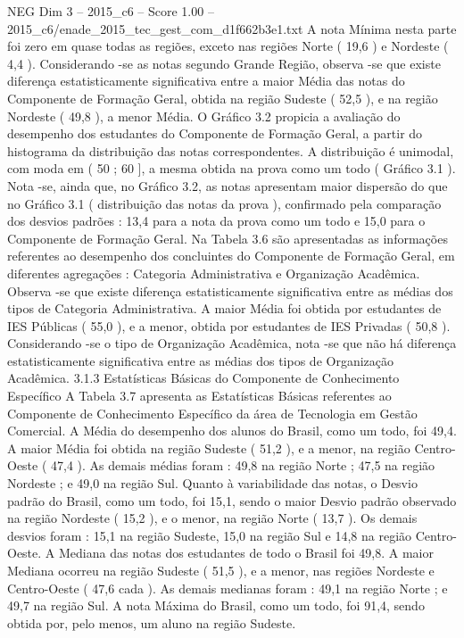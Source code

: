 \begin{textsample}{NEG Dim 3 – 2015\_c6 – Score 1.00 – 2015\_c6/enade\_2015\_tec\_gest\_com\_d1f662b3e1.txt}
A nota Mínima nesta parte foi zero em quase todas as regiões, exceto nas regiões Norte ( 19,6 ) e Nordeste ( 4,4 ).
Considerando -se as notas segundo Grande Região, observa -se que existe diferença estatisticamente significativa entre a maior Média das notas do Componente de Formação Geral, obtida na região Sudeste ( 52,5 ), e na região Nordeste ( 49,8 ), a menor Média.
O Gráfico 3.2 propicia a avaliação do desempenho dos estudantes do Componente de Formação Geral, a partir do histograma da distribuição das notas correspondentes.
A distribuição é unimodal, com moda em ( 50 ; 60 ], a mesma obtida na prova como um todo ( Gráfico 3.1 ).
Nota -se, ainda que, no Gráfico 3.2, as notas apresentam maior dispersão do que no Gráfico 3.1 ( distribuição das notas da prova ), confirmado pela comparação dos desvios padrões : 13,4 para a nota da prova como um todo e 15,0 para o Componente de Formação Geral.
Na Tabela 3.6 são apresentadas as informações referentes ao desempenho dos concluintes do Componente de Formação Geral, em diferentes agregações : Categoria Administrativa e Organização Acadêmica.
Observa -se que existe diferença estatisticamente significativa entre as médias dos tipos de Categoria Administrativa.
A maior Média foi obtida por estudantes de IES Públicas ( 55,0 ), e a menor, obtida por estudantes de IES Privadas ( 50,8 ).
Considerando -se o tipo de Organização Acadêmica, nota -se que não há diferença estatisticamente significativa entre as médias dos tipos de Organização Acadêmica. 3.1.3 Estatísticas Básicas do Componente de Conhecimento Específico A Tabela 3.7 apresenta as Estatísticas Básicas referentes ao Componente de Conhecimento Específico da área de Tecnologia em Gestão Comercial.
A Média do desempenho dos alunos do Brasil, como um todo, foi 49,4.
A maior Média foi obtida na região Sudeste ( 51,2 ), e a menor, na região Centro-Oeste ( 47,4 ).
As demais médias foram : 49,8 na região Norte ; 47,5 na região Nordeste ; e 49,0 na região Sul.
Quanto à variabilidade das notas, o Desvio padrão do Brasil, como um todo, foi 15,1, sendo o maior Desvio padrão observado na região Nordeste ( 15,2 ), e o menor, na região Norte ( 13,7 ).
Os demais desvios foram : 15,1 na região Sudeste, 15,0 na região Sul e 14,8 na região Centro-Oeste.
A Mediana das notas dos estudantes de todo o Brasil foi 49,8.
A maior Mediana ocorreu na região Sudeste ( 51,5 ), e a menor, nas regiões Nordeste e Centro-Oeste ( 47,6 cada ).
As demais medianas foram : 49,1 na região Norte ; e 49,7 na região Sul.
A nota Máxima do Brasil, como um todo, foi 91,4, sendo obtida por, pelo menos, um aluno na região Sudeste.

\end{textsample}
